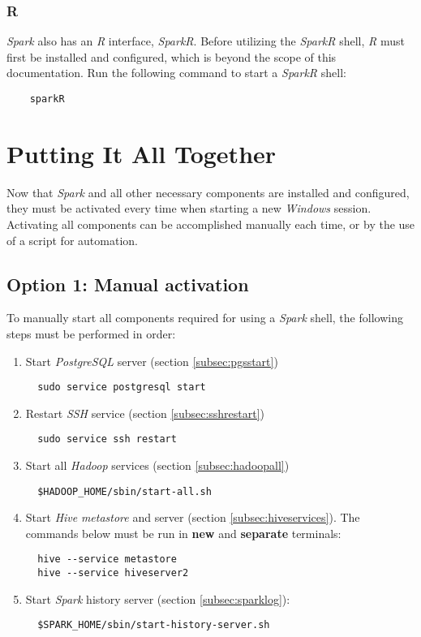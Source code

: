\documentclass{article}
\begin{document}
    \subsubsection{R}
    \emph{Spark} also has an \emph{R} interface, \emph{SparkR}. Before utilizing the \emph{SparkR}
    shell, \emph{R} must first be installed and configured, which is beyond the scope of this
    documentation. Run the following command to start a \emph{SparkR} shell:
    \begin{verbatim}
    sparkR
    \end{verbatim}

\newpage
\section{Putting It All Together}
Now that \emph{Spark} and all other necessary components are installed and configured, they must be
activated every time when starting a new \emph{Windows} session. Activating all components can be
accomplished manually each time, or by the use of a script for automation.

  \subsection{Option 1: Manual activation}
  To manually start all components required for using a \emph{Spark} shell, the following steps
  must be performed in order:
  \begin{enumerate}
  \item Start \emph{PostgreSQL} server (section \ref{subsec:pgsstart})
  \begin{verbatim}
  sudo service postgresql start
  \end{verbatim}

  \item Restart \emph{SSH} service (section \ref{subsec:sshrestart})
  \begin{verbatim}
  sudo service ssh restart
  \end{verbatim}

  \item Start all \emph{Hadoop} services (section \ref{subsec:hadoopall})
  \begin{verbatim}
  $HADOOP_HOME/sbin/start-all.sh
  \end{verbatim}

  \item Start \emph{Hive} \emph{metastore} and server (section \ref{subsec:hiveservices}).
  The commands below must be run in \textbf{new} and \textbf{separate} terminals:
  \begin{verbatim}
  hive --service metastore
  hive --service hiveserver2
  \end{verbatim}

  \item Start \emph{Spark} history server (section \ref{subsec:sparklog}):
  \begin{verbatim}
  $SPARK_HOME/sbin/start-history-server.sh
  \end{verbatim}
  \end{enumerate}
\end{document}
